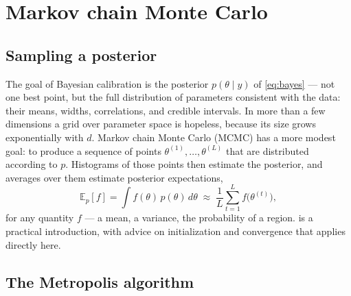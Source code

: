 \chapter{Markov chain Monte Carlo}
\label{ch:mcmc}

\section{Sampling a posterior}

The goal of Bayesian calibration is the posterior $p(\theta \mid y)$ of \cref{eq:bayes} --- not
one best point, but the full distribution of parameters consistent with the data: their means,
widths, correlations, and credible intervals. In more than a few dimensions a grid over parameter
space is hopeless, because its size grows exponentially with $d$. Markov chain Monte Carlo (MCMC)
has a more modest goal: to produce a sequence of points $\theta^{(1)}, \dots, \theta^{(L)}$ that are
distributed according to $p$. Histograms of those points then estimate the posterior, and averages
over them estimate posterior expectations,
\begin{equation}
  \mathbb{E}_p[f] = \int f(\theta)\, p(\theta)\, d\theta \;\approx\; \frac{1}{L}\sum_{t=1}^{L} f\big(\theta^{(t)}\big),
\end{equation}
for any quantity $f$ --- a mean, a variance, the probability of a region.  is a
practical introduction, with advice on initialization and convergence that applies directly here.

\section{The Metropolis algorithm}

